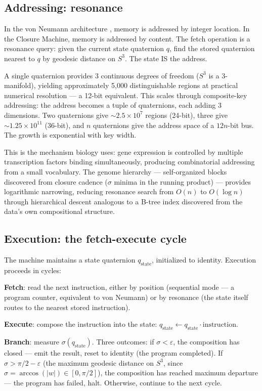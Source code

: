 \documentclass[12pt,a4paper]{article}
\begin{document}
\subsection{Addressing: resonance}

In the von Neumann architecture \cite{vonneumann1945}, memory is addressed by integer location. In the Closure Machine, memory is addressed by content. The fetch operation is a resonance query: given the current state quaternion $q$, find the stored quaternion nearest to $q$ by geodesic distance on $S^3$. The state IS the address.

A single quaternion provides 3 continuous degrees of freedom ($S^3$ is a 3-manifold), yielding approximately 5,000 distinguishable regions at practical numerical resolution --- a 12-bit equivalent. This scales through composite-key addressing: the address becomes a tuple of quaternions, each adding 3 dimensions. Two quaternions give $\sim 2.5 \times 10^7$ regions (24-bit), three give $\sim 1.25 \times 10^{11}$ (36-bit), and $n$ quaternions give the address space of a $12n$-bit bus. The growth is exponential with key width.

This is the mechanism biology uses: gene expression is controlled by multiple transcription factors binding simultaneously, producing combinatorial addressing from a small vocabulary. The genome hierarchy --- self-organized blocks discovered from closure cadence ($\sigma$ minima in the running product) --- provides logarithmic narrowing, reducing resonance search from $O(n)$ to $O(\log n)$ through hierarchical descent analogous to a B-tree index discovered from the data's own compositional structure.

\subsection{Execution: the fetch-execute cycle}

The machine maintains a state quaternion $q_{\text{state}}$, initialized to identity. Execution proceeds in cycles:

\textbf{Fetch}: read the next instruction, either by position (sequential mode --- a program counter, equivalent to von Neumann) or by resonance (the state itself routes to the nearest stored instruction).

\textbf{Execute}: compose the instruction into the state: $q_{\text{state}} \leftarrow q_{\text{state}} \cdot \text{instruction}$.

\textbf{Branch}: measure $\sigma(q_{\text{state}})$. Three outcomes: if $\sigma < \varepsilon$, the composition has closed --- emit the result, reset to identity (the program completed). If $\sigma > \pi/2 - \varepsilon$ (the maximum geodesic distance on $S^3$, since $\sigma = \arccos(|w|) \in [0, \pi/2]$), the composition has reached maximum departure --- the program has failed, halt. Otherwise, continue to the next cycle.
\end{document}
